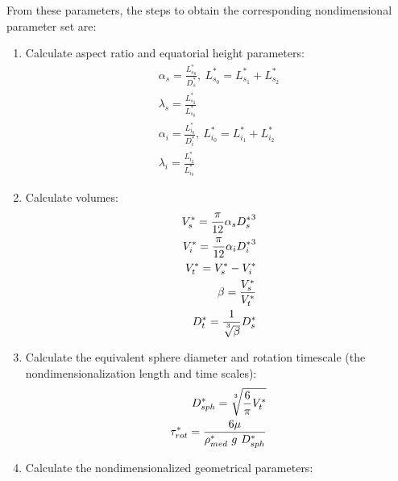 \documentclass[10pt,a4paper]{article}
\def\non{\nonumber}
\begin{document}
From these parameters, the steps to obtain the corresponding nondimensional parameter set are:
\begin{enumerate}
	\item Calculate aspect ratio and equatorial height parameters:
	\begin{eqnarray}\label{d2ndpars1}
		\alpha_s = \frac{L^*_{s_0}}{D^*_s}, ~ L^*_{s_0} = L^*_{s_1} + L^*_{s_2} \non \\
		\lambda_s = \frac{L^*_{s_2}}{L^*_{s_0}} \non \\
		\alpha_{i} = \frac{L^*_{i_0}}{D^*_i}, ~ L^*_{i_0} = L^*_{i_1} + L^*_{i_2} \non \\
		\lambda_{i} = \frac{L^*_{i_2}}{L^*_{i_0}}
	\end{eqnarray}
	\item Calculate volumes:
	\begin{eqnarray}\label{d2ndpars2}
		V_s^* = \frac{\pi}{12} \alpha_s {D_s^*}^3 \non \\
		V_i^* = \frac{\pi}{12} \alpha_i {D_i^*}^3 \non \\
		V_t^* = V_s^* - V_i^* \non \\
		\beta = \frac{V_s^*}{V_t^*} \non \\
		D_t^* = \frac{1}{\sqrt[\uproot{5}3]{\beta}} D_s^* \non \\
	\end{eqnarray}
	\item Calculate the equivalent sphere diameter and rotation timescale (the nondimensionalization length and time scales):
	\begin{eqnarray}\label{d2ndpars3}
		D_{sph}^* = \sqrt[\uproot{5}3]{\frac{6}{\pi} V_t^*} \non \\
		\tau_{rot}^* = \frac{6 \mu}{\rho^*_{med} ~ g ~ D_{sph}^*}
	\end{eqnarray}
	\item Calculate the nondimensionalized geometrical parameters:

\end{enumerate}
\end{document}
